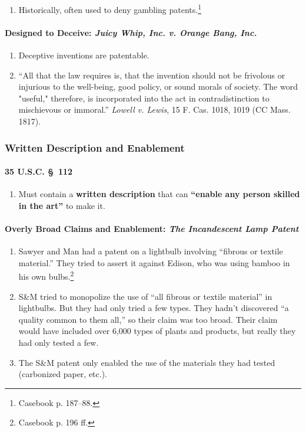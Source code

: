 \begin{enumerate}
    \item Historically, often used to deny gambling patents.\footnote{Casebook 
    p. 187--88.}
\end{enumerate}

\paragraph{Designed to Deceive: \emph{Juicy Whip, Inc. v. Orange Bang, Inc.}} 

\begin{enumerate}
    \item Deceptive inventions are patentable.
    \item ``All that the law requires is, that the invention should not be 
    frivolous or injurious to the well-being, good policy, or sound morals of 
    society. The word "useful," therefore, is incorporated into the act in 
    contradistinction to mischievous or immoral.'' \emph{Lowell v. Lewis}, 15 
    F. Cas. 1018, 1019 (CC Mass. 1817).
\end{enumerate}

\subsubsection{Written Description and Enablement}

\paragraph{35 U.S.C. \S\ 112}

\begin{enumerate}
    \item Must contain a \textbf{written description} that can 
    \textbf{``enable any person skilled in the art''} to make it.
\end{enumerate}

\paragraph{Overly Broad Claims and Enablement: \emph{The Incandescent Lamp 
Patent}}

\begin{enumerate}
    \item Sawyer and Man had a patent on a lightbulb involving ``fibrous or 
    textile material.'' They tried to assert it against Edison, who was using 
    bamboo in his own bulbs.\footnote{Casebook p. 196 ff.}
    \item S\&M tried to monopolize the use of ``all fibrous or textile 
    material'' in lightbulbs. But they had only tried a few types. They hadn't 
    discovered ``a quality common to them all,'' so their claim was too broad.  
    Their claim would have included over 6,000 types of plants and products, 
    but really they had only tested a few.
    \item The S\&M patent only enabled the use of the materials they had 
    tested (carbonized paper, etc.).
\end{enumerate}

